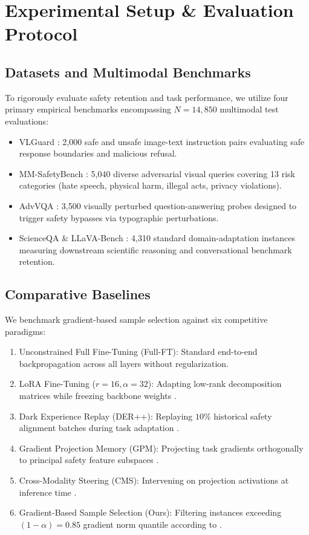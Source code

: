 \documentclass[10pt,twocolumn,letterpaper]{article}
\begin{document}
\begin{table}[t]
\section{Experimental Setup \& Evaluation Protocol}



\subsection{Datasets and Multimodal Benchmarks}

To rigorously evaluate safety retention and task performance, we utilize four primary empirical benchmarks encompassing $N = 14,850$ multimodal test evaluations:
\begin{itemize}
  \item VLGuard \cite{arxiv_2406_00584}: 2,000 safe and unsafe image-text instruction pairs evaluating safe response boundaries and malicious refusal.
  \item MM-SafetyBench \cite{arxiv_2311_17854}: 5,040 diverse adversarial visual queries covering 13 risk categories (hate speech, physical harm, illegal acts, privacy violations).
  \item AdvVQA \cite{arxiv_2308_12898}: 3,500 visually perturbed question-answering probes designed to trigger safety bypasses via typographic perturbations.
  \item ScienceQA \& LLaVA-Bench \cite{arxiv_2604_17215}: 4,310 standard domain-adaptation instances measuring downstream scientific reasoning and conversational benchmark retention.
\end{itemize}


\subsection{Comparative Baselines}

We benchmark gradient-based sample selection against six competitive paradigms:
\begin{enumerate}
  \item Unconstrained Full Fine-Tuning (Full-FT): Standard end-to-end backpropagation across all layers without regularization.
  \item LoRA Fine-Tuning ($r=16, \alpha=32$): Adapting low-rank decomposition matrices while freezing backbone weights \cite{arxiv_2308_12898}.
  \item Dark Experience Replay (DER++): Replaying $10\%$ historical safety alignment batches during task adaptation \cite{arxiv_2406_04028}.
  \item Gradient Projection Memory (GPM): Projecting task gradients orthogonally to principal safety feature subspaces \cite{arxiv_2404_01131}.
  \item Cross-Modality Steering (CMS): Intervening on projection activations at inference time \cite{arxiv_2501_02497}.
  \item Gradient-Based Sample Selection (Ours): Filtering instances exceeding $(1-\alpha)=0.85$ gradient norm quantile according to \cite{arxiv_2604_17215}.
\end{enumerate}





\end{table}
\end{document}
